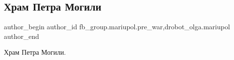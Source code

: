  
 
 
 
 

\subsection{Храм Петра Могили}
\label{sec:16_03_2023.fb.fb_group.mariupol.pre_war.1.khram_petra_mogili}
 
\ifcmt
 author_begin
   author_id fb_group.mariupol.pre_war,drobot_olga.mariupol
 author_end
\fi

Храм Петра Могили.

